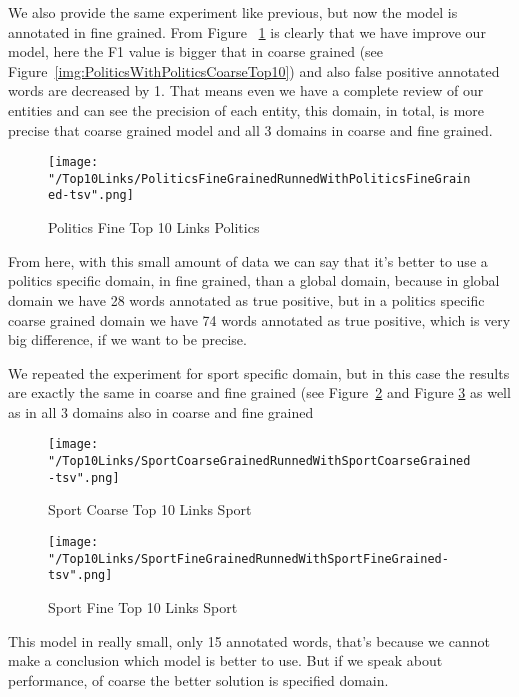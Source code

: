\documentclass[thesis=M,english]{FITthesis}[2018/05/30]
\begin{document}
	We also provide the same experiment like previous, but now the model is annotated in fine grained. From Figure ~\ref{img:PoliticsWithPoliticsFineTop10} is clearly that we have improve our model, here the F1 value is bigger that in coarse grained (see Figure~\ref{img:PoliticsWithPoliticsCoarseTop10}) and also false positive annotated words are decreased by 1. That means even we have a complete review of our entities and can see the precision of each entity, this domain, in total, is more precise that coarse grained model and all 3 domains in coarse and fine grained.
	\begin{figure}[H]\centering
		\texttt{[image: "/Top10Links/PoliticsFineGrainedRunnedWithPoliticsFineGrained-tsv".png]}
		\caption{Politics Fine Top 10 Links Politics}\label{img:PoliticsWithPoliticsFineTop10}
	\end{figure}
	From here, with this small amount of data we can say that it's better to use a politics specific domain, in fine grained, than a global domain, because in global domain we have 28 words annotated as true positive, but in a politics specific coarse grained domain we have 74 words annotated as true positive, which is very big difference, if we want to be precise.
	
	
	
	We repeated the experiment for sport specific domain, but in this case the results are exactly the same in coarse and fine grained (see Figure~\ref{img:SportWithSportCoarseTop10} and Figure \ref{img:SportWithSportFineTop10} as well as in all 3 domains also in coarse and fine grained
	\begin{figure}[H]\centering
		\texttt{[image: "/Top10Links/SportCoarseGrainedRunnedWithSportCoarseGrained-tsv".png]}
		\caption{Sport Coarse Top 10 Links Sport}\label{img:SportWithSportCoarseTop10}
	\end{figure}		
	
	\begin{figure}[H]\centering
		\texttt{[image: "/Top10Links/SportFineGrainedRunnedWithSportFineGrained-tsv".png]}
		\caption{Sport Fine Top 10 Links Sport}\label{img:SportWithSportFineTop10}	
	\end{figure}
	This model in really small, only 15 annotated words, that's because we cannot make a conclusion which model is better to use. But if we speak about performance, of coarse the better solution is specified domain.	
	
\end{document}
